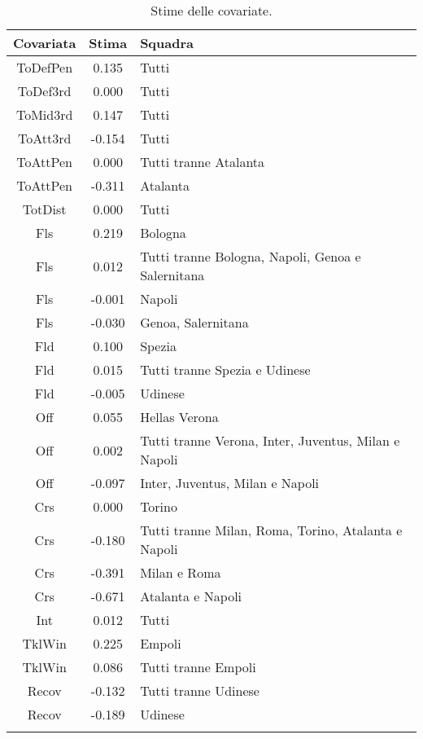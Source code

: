 \begin{table}[]%
	
\renewcommand{\arraystretch}{1.7}
\centering
\begin{tabular}{ccp{10cm}}
	\hline			
	\textbf{Covariata} & \textbf{Stima} & \textbf{Squadra} \\	
	\hline
	ToDefPen & 0.135 & Tutti \\      
	ToDef3rd & 0.000 & Tutti \\
	ToMid3rd & 0.147 &Tutti\\
	ToAtt3rd & -0.154 & Tutti \\  
	ToAttPen & 0.000 & Tutti tranne Atalanta \\    
	ToAttPen & -0.311 & Atalanta \\ 	     	 
	TotDist & 0.000 & Tutti \\	
	Fls & 0.219 & Bologna  \\
	Fls & 0.012 & Tutti tranne Bologna, Napoli, Genoa e Salernitana  \\ 		
	Fls & -0.001 & Napoli  \\
	Fls & -0.030 & Genoa, Salernitana  \\
	Fld & 0.100 & Spezia \\
	Fld & 0.015 & Tutti tranne Spezia e Udinese  \\
	Fld & -0.005 & Udinese \\
	Off & 0.055 & Hellas Verona\\
	Off & 0.002 & Tutti tranne Verona, Inter, Juventus, Milan e Napoli\\
	Off & -0.097 & Inter, Juventus, Milan e Napoli  \\
	Crs & 0.000 & Torino\\
	Crs & -0.180 & Tutti tranne Milan, Roma, Torino, Atalanta e Napoli\\
	Crs & -0.391 & Milan e Roma\\
	Crs & -0.671 & Atalanta e Napoli\\
	Int & 0.012 & Tutti\\
	TklWin &  0.225 & Empoli  \\
	TklWin &  0.086 & Tutti tranne Empoli  \\ 
	Recov &  -0.132& Tutti tranne Udinese \\ 
	Recov &  -0.189& Udinese \\ 
\hline
& &  \\

\end{tabular} \hbox{}
\caption{Stime delle covariate.} \label{tab:BTCL3} 
\end{table}

